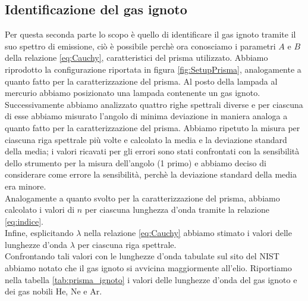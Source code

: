 \documentclass[letterpaper,12pt]{article}
\begin{document}
\subsection{Identificazione del gas ignoto}
Per questa seconda parte lo scopo è quello di identificare il gas ignoto tramite il suo spettro di emissione, ciò è possibile 
perchè ora conosciamo  i parametri $A$ e $B$ della relazione \eqref{eq:Cauchy}, caratteristici del prisma utilizzato.
Abbiamo riprodotto la configurazione riportata in figura \ref{fig:SetupPrisma}, analogamente a quanto fatto per la 
caratterizzazione del prisma. Al posto della lampada al mercurio abbiamo posizionato una lampada contenente un gas
ignoto.
Successivamente abbiamo analizzato quattro righe spettrali diverse e per ciascuna di esse abbiamo misurato 
l'angolo di minima deviazione in maniera analoga a quanto fatto per la caratterizzazione del prisma. 
Abbiamo ripetuto la misura per ciascuna riga spettrale più volte e calcolato la media e la deviazione standard della media; i
valori ricavati per gli errori sono stati confrontati con la sensibilità dello strumento per la misura dell'angolo (1 primo) e abbiamo deciso di
considerare come errore la sensibilità, perchè la deviazione standard della media era minore. \\
Analogamente a quanto svolto per la caratterizzazione del prisma, abbiamo calcolato i valori di $n$ per ciascuna
lunghezza d'onda tramite la relazione \eqref{eq:indice}.\\
Infine, esplicitando
$\lambda$ nella relazione \eqref{eq:Cauchy} abbiamo stimato i valori delle lunghezze d'onda $\lambda$ per ciascuna riga spettrale. \\
Confrontando tali valori con le lunghezze d'onda tabulate sul sito del NIST abbiamo notato che il gas ignoto si avvicina maggiormente
all'elio.
Riportiamo nella tabella \ref{tab:prisma_ignoto} i valori delle lunghezze d'onda del gas ignoto e dei gas nobili He, Ne e Ar.
\end{document}
